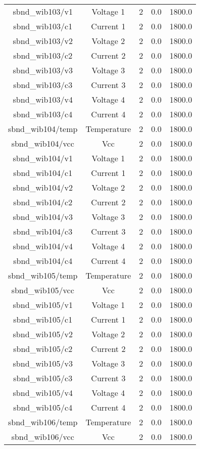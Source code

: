 \begin{table}[ptb]
\begin{tabular}{c | c c c c}
sbnd_wib103/v1 & Voltage 1 & 2 & 0.0 & 1800.0\\ 
sbnd_wib103/c1 & Current 1 & 2 & 0.0 & 1800.0\\ 
sbnd_wib103/v2 & Voltage 2 & 2 & 0.0 & 1800.0\\ 
sbnd_wib103/c2 & Current 2 & 2 & 0.0 & 1800.0\\ 
sbnd_wib103/v3 & Voltage 3 & 2 & 0.0 & 1800.0\\ 
sbnd_wib103/c3 & Current 3 & 2 & 0.0 & 1800.0\\ 
sbnd_wib103/v4 & Voltage 4 & 2 & 0.0 & 1800.0\\ 
sbnd_wib103/c4 & Current 4 & 2 & 0.0 & 1800.0\\ 
sbnd_wib104/temp & Temperature & 2 & 0.0 & 1800.0\\ 
sbnd_wib104/vcc & Vcc & 2 & 0.0 & 1800.0\\ 
sbnd_wib104/v1 & Voltage 1 & 2 & 0.0 & 1800.0\\ 
sbnd_wib104/c1 & Current 1 & 2 & 0.0 & 1800.0\\ 
sbnd_wib104/v2 & Voltage 2 & 2 & 0.0 & 1800.0\\ 
sbnd_wib104/c2 & Current 2 & 2 & 0.0 & 1800.0\\ 
sbnd_wib104/v3 & Voltage 3 & 2 & 0.0 & 1800.0\\ 
sbnd_wib104/c3 & Current 3 & 2 & 0.0 & 1800.0\\ 
sbnd_wib104/v4 & Voltage 4 & 2 & 0.0 & 1800.0\\ 
sbnd_wib104/c4 & Current 4 & 2 & 0.0 & 1800.0\\ 
sbnd_wib105/temp & Temperature & 2 & 0.0 & 1800.0\\ 
sbnd_wib105/vcc & Vcc & 2 & 0.0 & 1800.0\\ 
sbnd_wib105/v1 & Voltage 1 & 2 & 0.0 & 1800.0\\ 
sbnd_wib105/c1 & Current 1 & 2 & 0.0 & 1800.0\\ 
sbnd_wib105/v2 & Voltage 2 & 2 & 0.0 & 1800.0\\ 
sbnd_wib105/c2 & Current 2 & 2 & 0.0 & 1800.0\\ 
sbnd_wib105/v3 & Voltage 3 & 2 & 0.0 & 1800.0\\ 
sbnd_wib105/c3 & Current 3 & 2 & 0.0 & 1800.0\\ 
sbnd_wib105/v4 & Voltage 4 & 2 & 0.0 & 1800.0\\ 
sbnd_wib105/c4 & Current 4 & 2 & 0.0 & 1800.0\\ 
sbnd_wib106/temp & Temperature & 2 & 0.0 & 1800.0\\ 
sbnd_wib106/vcc & Vcc & 2 & 0.0 & 1800.0\\ 

\end{tabular}
\end{table}
